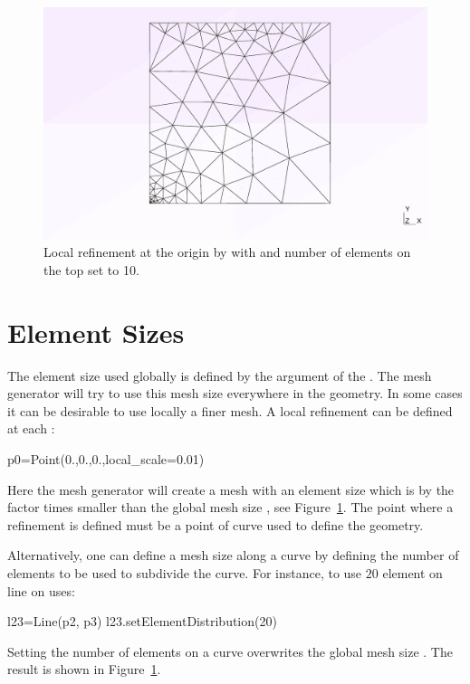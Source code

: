 \begin{figure}
\centerline{\includegraphics[width=\figwidth]{figures/refine1}}
\caption{Local refinement at the origin by
with  and number of elements on the top set to 10.}
\label{fig:PYCAD 5}
\end{figure}

\section{Element Sizes}
The element size used globally is defined by the 
 argument of the . The mesh generator 
will try to use this mesh size everywhere in the geometry. In some cases it can be 
desirable to use locally a finer mesh. A local refinement can be defined at each 
:
\begin{python}
p0=Point(0.,0.,0.,local_scale=0.01)
\end{python}
Here the mesh generator will create a mesh with an element size which is by the factor  
times smaller than the global mesh size , see Figure~\ref{fig:PYCAD 5}. The point where a refinement is defined must be a point of curve used to define the geometry. 

Alternatively, one can define a mesh size along a curve by defining the number of elements to be used to subdivide the curve. For instance, to use $20$ element on line  on uses:
\begin{python}
l23=Line(p2, p3)
l23.setElementDistribution(20)
\end{python}
Setting the number of elements on a curve overwrites the global mesh size . The result is shown in Figure~\ref{fig:PYCAD 5}. 

